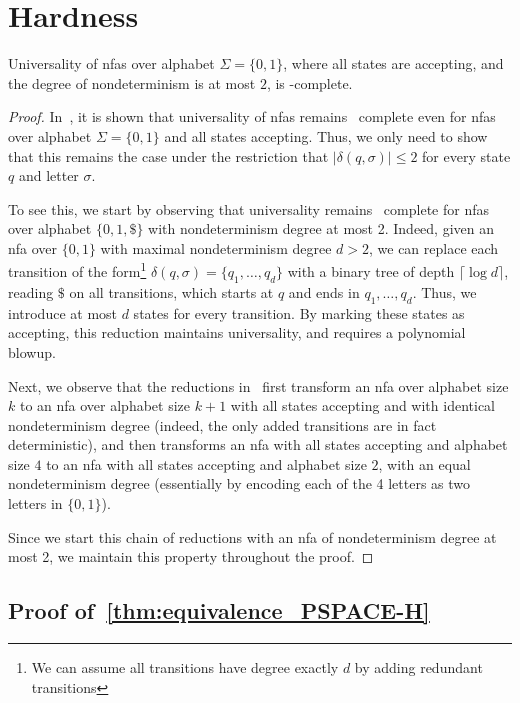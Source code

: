 \chapter{\PSPACE Hardness}
\label{chap:apx}

\begin{lemma}
\label{lem:universalityofnfa}
Universality of \glspl{nfa} over alphabet $\Sigma=\{0,1\}$, where all states are accepting, and the degree of nondeterminism is at most $2$, is \PSPACE-complete.
\end{lemma}
\begin{proof}
In~\cite{kao2009nfas}, it is shown that universality of \glspl{nfa} remains \PSPACE\ complete even for \glspl{nfa} over alphabet $\Sigma=\{0,1\}$ and all states accepting. Thus, we only need to show that this remains the case under the restriction that $|\delta(q,\sigma)|\le 2$ for every state $q$ and letter $\sigma$.

To see this, we start by observing that universality remains \PSPACE\ complete for \glspl{nfa} over alphabet $\{0,1,\$\}$ with nondeterminism degree at most 2. Indeed, given an \gls{nfa} over $\{0,1\}$ with maximal nondeterminism degree $d>2$, we can replace each transition of the form\footnote{We can assume all transitions have degree exactly $d$ by adding redundant transitions} $\delta(q,\sigma)=\{q_1,\ldots, q_d\}$ with a binary tree of depth $\lceil \log d \rceil$, reading $\$$ on all transitions, which starts at $q$ and ends in $q_1,\ldots,q_d$. Thus, we introduce at most $d$ states for every transition. By marking these states as accepting, this reduction maintains universality, and requires a polynomial blowup.

Next, we observe that the reductions in~\cite[Lemma 2]{kao2009nfas} first transform an \gls{nfa} over alphabet size $k$ to an \gls{nfa} over alphabet size $k+1$ with all states accepting and with identical nondeterminism degree (indeed, the only added transitions are in fact deterministic), and then transforms an \gls{nfa} with all states accepting and alphabet size $4$ to an \gls{nfa} with all states accepting and alphabet size $2$, with an equal nondeterminism degree (essentially by encoding each of the 4 letters as two letters in $\{0,1\}$).

Since we start this chain of reductions with an \gls{nfa} of nondeterminism degree at most 2, we maintain this property throughout the proof.
\end{proof}

\section{Proof of~\cref{thm:equivalence_PSPACE-H}}
\label{apx:proof_equivalence_PSPACE-H}

